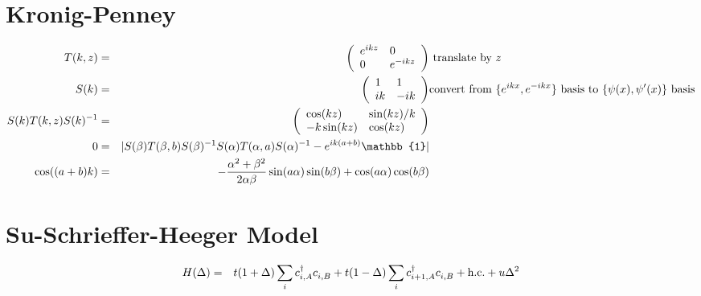 \documentclass[12pt]{article}
\begin{document}
\section{Kronig-Penney}
\begin{align*}T(k, z) &=& \left(\begin{array}{ll}
e^{ikz} & 0\\
0 & e^{-ikz}\\
\end{array}
\right) & \mbox{ translate by }z\\
S(k) &=& \left(\begin{array}{ll}
1 & 1\\
ik & -ik\\
\end{array}
\right)& \mbox{convert from }\{e^{ikx},e^{-ikx}\}\mbox{ basis to }\{\psi(x), \psi'(x)\}\mbox{ basis}\\
S(k)T(k,z)S(k)^{-1} &=& \left(\begin{array}{ll}
\cos(kz) & \sin(kz)/k\\
-k\sin(kz) & \cos(kz)\\
\end{array}
\right)\\
0 &=& |S(\beta)T(\beta,b)S(\beta)^{-1}S(\alpha)T(\alpha,a)S(\alpha)^{-1}-e^{ik(a+b)}\mathbb{1}|\\
\cos((a+b)k) &=& -{\alpha^2+\beta^2\over2\alpha\beta}\sin(a\alpha)\sin(b\beta)+\cos(a\alpha)\cos(b\beta)
\end{align*}

\section{Su-Schrieffer-Heeger Model}
\begin{eqnarray}
H(\Delta) &=& t(1+\Delta)\sum_ic_{i,A}^\dagger c_{i,B}^{\hphantom{\dagger}}+t(1-\Delta)\sum_ic_{i+1,A}^\dagger c_{i,B}^{\hphantom{\dagger}}+\mbox{h.c.}+u\Delta^2 \\
\end{eqnarray}
\end{document}
